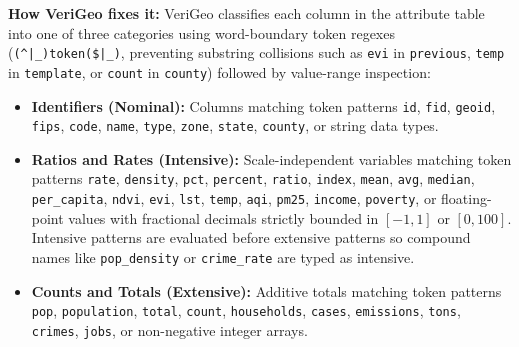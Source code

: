 \documentclass[10pt,twocolumn]{article}
\begin{document}
\textbf{How VeriGeo fixes it:} VeriGeo classifies each column in the attribute table into one of three categories using word-boundary token regexes (\texttt{(\string^|\_)token(\$|\_)}, preventing substring collisions such as \texttt{evi} in \texttt{previous}, \texttt{temp} in \texttt{template}, or \texttt{count} in \texttt{county}) followed by value-range inspection:
\begin{itemize}
  \item \textbf{Identifiers (Nominal):} Columns matching token patterns \texttt{id}, \texttt{fid}, \texttt{geoid}, \texttt{fips}, \texttt{code}, \texttt{name}, \texttt{type}, \texttt{zone}, \texttt{state}, \texttt{county}, or string data types.
  \item \textbf{Ratios and Rates (Intensive):} Scale-independent variables matching token patterns \texttt{rate}, \texttt{density}, \texttt{pct}, \texttt{percent}, \texttt{ratio}, \texttt{index}, \texttt{mean}, \texttt{avg}, \texttt{median}, \texttt{per\_capita}, \texttt{ndvi}, \texttt{evi}, \texttt{lst}, \texttt{temp}, \texttt{aqi}, \texttt{pm25}, \texttt{income}, \texttt{poverty}, or floating-point values with fractional decimals strictly bounded in $[-1, 1]$ or $[0, 100]$. Intensive patterns are evaluated before extensive patterns so compound names like \texttt{pop\_density} or \texttt{crime\_rate} are typed as intensive.
  \item \textbf{Counts and Totals (Extensive):} Additive totals matching token patterns \texttt{pop}, \texttt{population}, \texttt{total}, \texttt{count}, \texttt{households}, \texttt{cases}, \texttt{emissions}, \texttt{tons}, \texttt{crimes}, \texttt{jobs}, or non-negative integer arrays.
\end{itemize}
\end{document}
